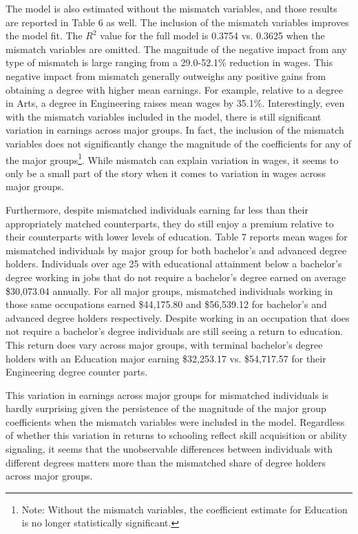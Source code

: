 \documentclass[11pt]{article}
\theoremstyle{definition}
\begin{document}
The model is also estimated without the mismatch variables, and those results are reported in Table 6 as well.  The inclusion of the mismatch variables improves the model fit.  The $R^2$ value for the full model is 0.3754 vs. 0.3625 when the mismatch variables are omitted.  The magnitude of the negative impact from any type of mismatch is large ranging from a 29.0-52.1\% reduction in wages.  This negative impact from mismatch generally outweighs any positive gains from obtaining a degree with higher mean earnings.  For example, relative to a degree in Arts, a degree in Engineering raises mean wages by 35.1\%.  Interestingly, even with the mismatch variables included in the model, there is still significant variation in earnings across major groups.  In fact, the inclusion of the mismatch variables does not significantly change the magnitude of the coefficients for any of the major groups\footnote{Note: Without the mismatch variables,  the coefficient estimate for Education is no longer statistically significant.}.  While mismatch can explain variation in wages, it seems to only be a small part of the story when it comes to variation in wages across major groups.  

Furthermore, despite mismatched individuals earning far less than their appropriately matched counterparts, they do still enjoy a premium relative to their counterparts with lower levels of education.  Table 7 reports mean wages for mismatched individuals by major group for both bachelor's and advanced degree holders.  Individuals over age 25 with educational attainment below a bachelor's degree working in jobs that do not require a bachelor's degree earned on average \$30,073.04 annually.  For all major groups, mismatched individuals working in those same occupations earned \$44,175.80 and \$56,539.12 for bachelor's and advanced degree holders respectively.  Despite working in an occupation that does not require a bachelor's degree individuals are still seeing a return to education.  This return does vary across major groups, with terminal bachelor's degree holders with an Education major earning \$32,253.17 vs. \$54,717.57 for their Engineering degree counter parts.

This variation in earnings across major groups for mismatched individuals is hardly surprising given the persistence of the magnitude of the major group coefficients when the mismatch variables were included in the model.  Regardless of whether this variation in returns to schooling reflect skill acquisition or ability signaling, it seems that the unobservable differences between individuals with different degrees matters more than the mismatched share of degree holders across major groups.  
\end{document}
